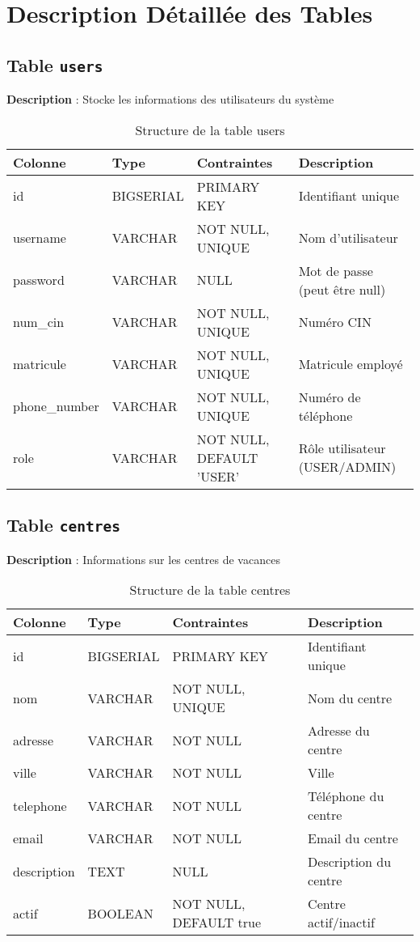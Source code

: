 \documentclass[12pt,a4paper]{article}
\begin{document}
\section{Description Détaillée des Tables}

\subsection{Table \texttt{users}}
\textbf{Description} : Stocke les informations des utilisateurs du système

\begin{table}[h]
\centering
\begin{tabular}{|l|l|l|p{6cm}|}
\hline
\textbf{Colonne} & \textbf{Type} & \textbf{Contraintes} & \textbf{Description} \\
\hline
id & BIGSERIAL & PRIMARY KEY & Identifiant unique \\
\hline
username & VARCHAR & NOT NULL, UNIQUE & Nom d'utilisateur \\
\hline
password & VARCHAR & NULL & Mot de passe (peut être null) \\
\hline
num\_cin & VARCHAR & NOT NULL, UNIQUE & Numéro CIN \\
\hline
matricule & VARCHAR & NOT NULL, UNIQUE & Matricule employé \\
\hline
phone\_number & VARCHAR & NOT NULL, UNIQUE & Numéro de téléphone \\
\hline
role & VARCHAR & NOT NULL, DEFAULT 'USER' & Rôle utilisateur (USER/ADMIN) \\
\hline
\end{tabular}
\caption{Structure de la table users}
\end{table}

\subsection{Table \texttt{centres}}
\textbf{Description} : Informations sur les centres de vacances

\begin{table}[h]
\centering
\begin{tabular}{|l|l|l|p{6cm}|}
\hline
\textbf{Colonne} & \textbf{Type} & \textbf{Contraintes} & \textbf{Description} \\
\hline
id & BIGSERIAL & PRIMARY KEY & Identifiant unique \\
\hline
nom & VARCHAR & NOT NULL, UNIQUE & Nom du centre \\
\hline
adresse & VARCHAR & NOT NULL & Adresse du centre \\
\hline
ville & VARCHAR & NOT NULL & Ville \\
\hline
telephone & VARCHAR & NOT NULL & Téléphone du centre \\
\hline
email & VARCHAR & NOT NULL & Email du centre \\
\hline
description & TEXT & NULL & Description du centre \\
\hline
actif & BOOLEAN & NOT NULL, DEFAULT true & Centre actif/inactif \\
\hline
\end{tabular}
\caption{Structure de la table centres}
\end{table}
\end{document}
